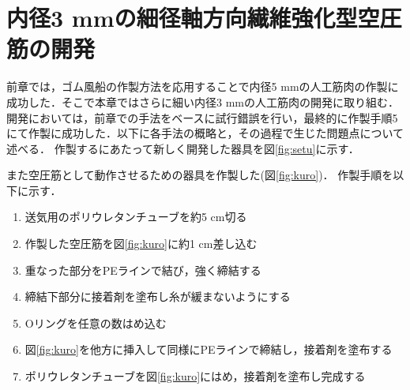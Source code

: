 \newpage

\section{内径3 mmの細径軸方向繊維強化型空圧筋の開発}
前章では，ゴム風船の作製方法を応用することで内径5 mmの人工筋肉の作製に成功した．そこで本章ではさらに細い内径3 mmの人工筋肉の開発に取り組む．
開発においては，前章での手法をベースに試行錯誤を行い，最終的に作製手順5にて作製に成功した．以下に各手法の概略と，その過程で生じた問題点について述べる．
作製するにあたって新しく開発した器具を図\ref{fig:setu}に示す．

また空圧筋として動作させるための器具を作製した(図\ref{fig:kuro})．
作製手順を以下に示す．
\begin{enumerate}
  \item 送気用のポリウレタンチューブを約5 cm切る
  \item 作製した空圧筋を図\ref{fig:kuro}に約1 cm差し込む
  \item 重なった部分をPEラインで結び，強く締結する
  \item 締結下部分に接着剤を塗布し糸が緩まないようにする
  \item Oリングを任意の数はめ込む
  \item 図\ref{fig:kuro}を他方に挿入して同様にPEラインで締結し，接着剤を塗布する
  \item ポリウレタンチューブを図\ref{fig:kuro}にはめ，接着剤を塗布し完成する
\end{enumerate}

